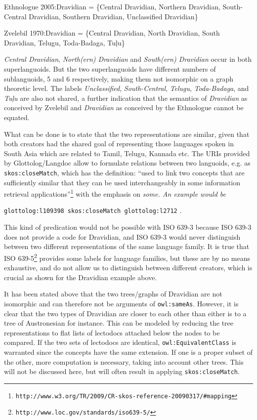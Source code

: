 \documentclass{llncs}
\begin{document}
\ea Ethnologue 2005:Dravidian = \{Central Dravidian, Northern Dravidian, South-Central Dravidian, Southern Dravidian, Unclassified Dravidian\} \z

\ea Zvelebil 1970:Dravidian  = \{Central Dravidian, North Dravidian, South Dravidian, Telugu, Toda-Badaga, Tuḷu\} \z

\textit{Central Dravidian}, \textit{North(ern) Dravidian} and \textit{South(ern) Dravidian} occur in both superlanguoids. But the two superlanguoids have different numbers of sublanguoids, 5 and 6 respectively, making them not isomorphic on a graph theoretic level. The labels \textit{Unclassified}, \textit{South-Central}, \textit{Telugu}, \textit{Toda-Badaga}, and \textit{Tuḷu}   are also not shared, a further indication that the semantics of \textit{Dravidian} as conceived by Zvelebil and \textit{Dravidian} as conceived by the Ethnologue cannot be equated.

What can be done is to state that the two representations are similar, given that both creators had the shared goal of representing those languages spoken in South Asia which are related to Tamil, Telugu, Kannada etc. 
The URIs provided by Glottolog/Langdoc allow to formulate relations between two languoids, e.g. as  \texttt{skos:closeMatch}, which has the definition: ``used to link two concepts that are sufficiently similar that they can be used interchangeably in some information retrieval applications''\footnote{\texttt{http://www.w3.org/TR/2009/CR-skos-reference-20090317/\#mapping}} with the emphasis on \em some\em. An example would be

\ea \texttt{glottolog:l109398 skos:closeMatch glottolog:l2712} . \z

This kind of predication would not be possible with ISO 639-3 because ISO 639-3 does not provide a code for Dravidian, and ISO 639-3 would never distinguish between two different representations of the same language family. It is true that ISO 639-5\footnote{\texttt{http://www.loc.gov/standards/iso639-5/}} provides some labels for language families, but these are by no means exhaustive, and do not allow us to distinguish between different creators, which is crucial as shown for the Dravidian example above.

It has been stated above that the two trees/graphs of Dravidian are not isomorphic and can therefore not be arguments of \texttt{owl:sameAs}. However, it is clear that the two types of Dravidian are closer to each other than either is to a tree of Austronesian for instance. This can be modeled by reducing the tree representations to   flat lists of lectodocs attached below the nodes to be compared. If the two sets of lectodocs are identical, \texttt{owl:EquivalentClass} is  warranted since the concepts have the same extension. If one is a proper subset of the other, more computation is necessary, taking into account other trees. This will not be discussed here, but will often result in applying \texttt{skos:closeMatch}.
\end{document}
